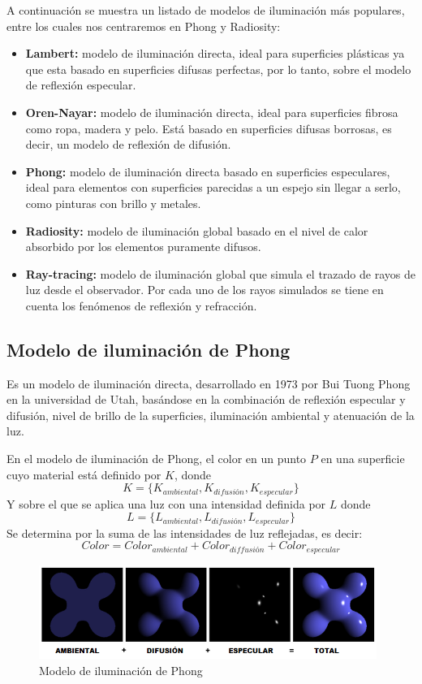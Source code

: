 A continuación se muestra un listado de modelos de iluminación más populares, entre los cuales nos centraremos en Phong y Radiosity:

\begin{itemize}
\item \textbf{Lambert:} modelo de iluminación directa, ideal para superficies plásticas ya que esta basado en superficies difusas perfectas, por lo tanto, sobre el modelo de reflexión especular.
\item \textbf{Oren-Nayar:} modelo de iluminación directa, ideal para superficies fibrosa como ropa, madera y pelo. Está basado en superficies difusas borrosas, es decir, un modelo de reflexión de difusión.
\item \textbf{Phong:} modelo de iluminación directa basado en superficies especulares, ideal para elementos con superficies parecidas a un espejo sin llegar a serlo, como pinturas con brillo y metales.
\item \textbf{Radiosity:} modelo de iluminación global basado en el nivel de calor absorbido por los elementos puramente difusos.
\item \textbf{Ray-tracing:} modelo de iluminación global que simula el trazado de rayos de luz desde el observador. Por cada uno de los rayos simulados se tiene en cuenta los fenómenos de reflexión y refracción.
\end{itemize}

\subsection{Modelo de iluminación de Phong}

Es un modelo de iluminación directa, desarrollado en 1973 por Bui Tuong Phong en la universidad de Utah, basándose en la combinación de reflexión especular y difusión, nivel de brillo de la superficies, iluminación ambiental y atenuación de la luz. 
\newline 

En el modelo de iluminación de Phong, el color en un punto $P$ en una superficie cuyo material está definido por $K$, donde 
      $$ K = \{ K_{ambiental}, K_{difusión}, K_{especular} \}$$ 
Y sobre el que se aplica una luz con una intensidad definida por $ L $ donde 
$$ L = \{ L_{ambiental}, L_{difusión}, L_{especular}\} $$ 
Se determina por la suma de las intensidades de luz reflejadas, es decir: 
$$ Color = Color_{ambiental} + Color_{diffusión} + Color_{especular} $$ 

\begin{figure}[h]
	\centering
	          \includegraphics[width=11cm]{img/PhongComponent.png}
	\caption{Modelo de iluminación de Phong}
\end{figure}


